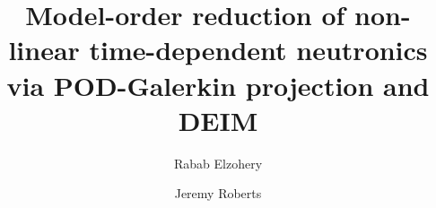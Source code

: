 \documentclass[review,number,sort&compress,12pt]{elsarticle}
\begin{document}
% 
\begin{frontmatter}



\title{Model-order reduction of non-linear time-dependent neutronics via POD-Galerkin projection and DEIM}
\author[focal]{Rabab Elzohery}
\author{Jeremy Roberts}
\address {The Alan Levin Department of Mechanical and Nuclear Engineering,
	Kansas State University \\
	3002 Rathbone Hall, Manhattan, KS 66506, US \\ rababelzohery@ksu.edu, jaroberts@ksu.edu}



\end{frontmatter}
\end{document}
